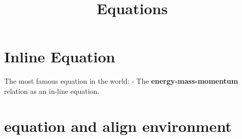 \documentclass{article}
\title{Equations}
\date{}
\begin{document}
\maketitle

\section*{Inline Equation}


The most famous equation in the world:  - The \textbf{energy-mass-momentum} relation as an in-line equation.

\section{equation and align environment}





\end{document}

